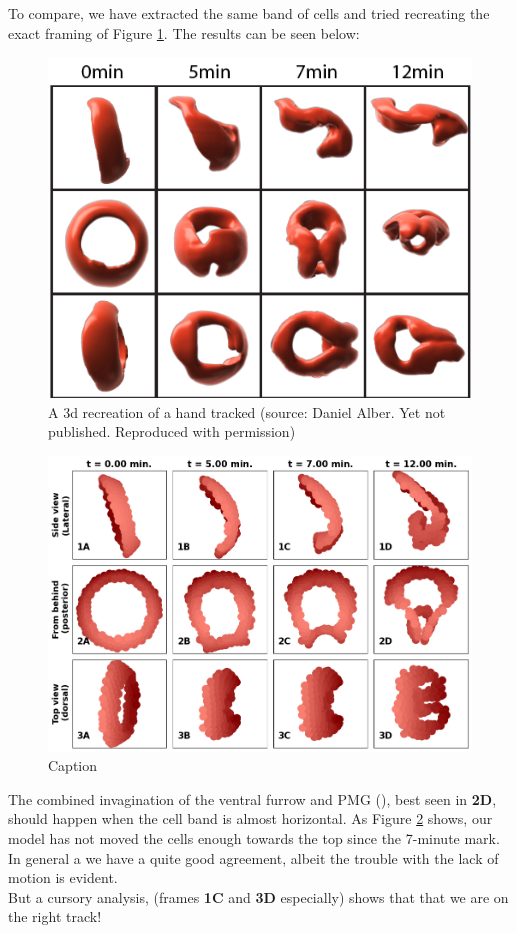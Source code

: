 To compare, we have extracted the same band of cells and tried recreating the exact framing of Figure \ref{fig:daniel-cells}. The results can be seen below:
\newpage
\begin{figure}[H]
    \centering
    \includegraphics[width=0.7 \linewidth]{chapters/Results/figures/DanielCut.png}
    \caption{A 3d recreation of a hand tracked  (source: Daniel Alber. Yet not published. Reproduced with permission)}
    \label{fig:daniel-cells}
\end{figure}
\begin{figure}[H]
    \centering
    \includegraphics[width=0.8\linewidth]{chapters/Results/figures/CompareToDaniel.png}
    \caption{Caption}
    \label{fig:comparetodaniel}
\end{figure}




The combined invagination of the ventral furrow and PMG (), best seen in \textbf{2D}, should happen when the cell band is almost horizontal. As Figure \ref{fig:comparetodaniel} shows, our model has not moved the cells enough towards the top since the 7-minute mark. In general a we have a quite good agreement, albeit the trouble with the lack of motion is evident.\\ But a cursory analysis, (frames \textbf{1C} and \textbf{3D} especially) shows that that we are on the right track!\\



